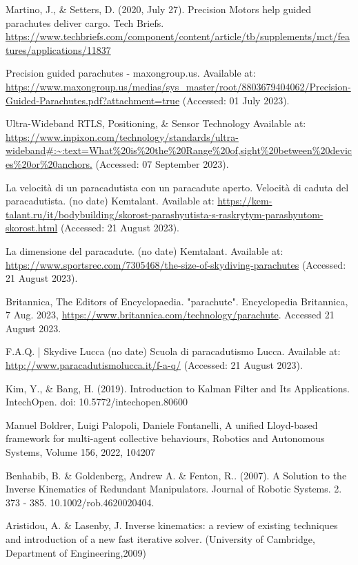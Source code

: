 \begin{thebibliography}{00}
 Martino, J., \& Setters, D. (2020, July 27). Precision Motors help guided parachutes deliver cargo. Tech Briefs. \url{https://www.techbriefs.com/component/content/article/tb/supplements/mct/features/applications/11837}

 Precision guided parachutes - maxongroup.us. Available at: \url{https://www.maxongroup.us/medias/sys_master/root/8803679404062/Precision-Guided-Parachutes.pdf?attachment=true} (Accessed: 01 July 2023).

 Ultra-Wideband RTLS, Positioning, \& Sensor Technology Available at: \url{https://www.inpixon.com/technology/standards/ultra-wideband#:~:text=What%20is%20the%20Range%20of,sight%20between%20devices%20or%20anchors.} (Accessed: 07 September 2023). 

 La velocità di un paracadutista con un paracadute aperto. Velocità di caduta del paracadutista. (no date) Kemtalant. Available at: \url{https://kem-talant.ru/it/bodybuilding/skorost-parashyutista-s-raskrytym-parashyutom-skorost.html} (Accessed: 21 August 2023). 

 La dimensione del paracadute. (no date) Kemtalant. Available at: \url{https://www.sportsrec.com/7305468/the-size-of-skydiving-parachutes} (Accessed: 21 August 2023). 

 Britannica, The Editors of Encyclopaedia. "parachute". Encyclopedia Britannica, 7 Aug. 2023, \url{https://www.britannica.com/technology/parachute}. Accessed 21 August 2023.

 F.A.Q. | Skydive Lucca (no date) Scuola di paracadutismo Lucca. Available at: \url{http://www.paracadutismolucca.it/f-a-q/} (Accessed: 21 August 2023). 

 Kim, Y., \& Bang, H. (2019). Introduction to Kalman Filter and Its Applications. IntechOpen. doi: 10.5772/intechopen.80600

 Manuel Boldrer, Luigi Palopoli, Daniele Fontanelli,
A unified Lloyd-based framework for multi-agent collective behaviours,
Robotics and Autonomous Systems,
Volume 156,
2022,
104207

 Benhabib, B. \& Goldenberg, Andrew A. \& Fenton, R.. (2007). A Solution to the Inverse Kinematics of Redundant Manipulators. Journal of Robotic Systems. 2. 373 - 385. 10.1002/rob.4620020404. 

 Aristidou, A. \& Lasenby, J. Inverse kinematics: a review of existing techniques and introduction of a new fast iterative solver. (University of Cambridge, Department of Engineering,2009)


\end{thebibliography}
